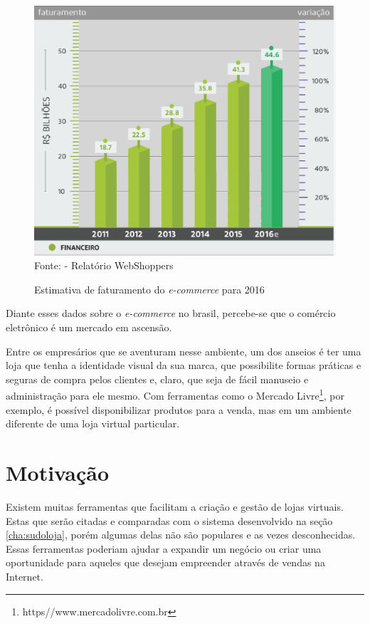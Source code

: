 \documentclass[a4paper,12pt]{monografia}
\begin{document}
\begin{figure}[H]
\centering
\caption{Estimativa de faturamento do \textit{e-commerce} para 2016}
\centering
\includegraphics[width=12cm]{img/webshoppers/estimativa-faturamento.eps}\\
\small{Fonte:  - Relatório WebShoppers}
\label{figura:estimativa:faturamento}
\end{figure}

Diante esses dados sobre o \textit{e-commerce} no brasil, percebe-se que o comércio eletrônico é um mercado em ascensão.

Entre os empresários que se aventuram nesse ambiente, um dos anseios é ter uma loja que tenha a identidade visual da sua marca, que possibilite formas práticas e seguras de compra pelos clientes e, claro, que seja de fácil manuseio e administração para ele mesmo. Com ferramentas como o Mercado Livre\footnote{https//www.mercadolivre.com.br}, por exemplo, é possível disponibilizar produtos para a venda, mas em um ambiente diferente de uma loja virtual particular.

\section{Motivação} %
\label{sec:motivacao}

Existem muitas ferramentas que facilitam a criação e gestão de lojas virtuais. Estas que serão citadas e comparadas com o sistema desenvolvido na seção \ref{cha:sudoloja}, porém algumas delas não são populares e as vezes desconhecidas. Essas ferramentas poderiam ajudar a expandir um negócio ou criar uma oportunidade para aqueles que desejam empreender através de vendas na Internet. 
\end{document}
